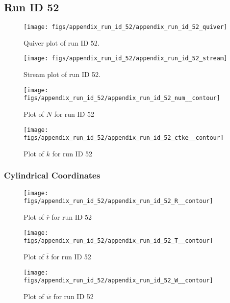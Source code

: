 \subsection{Run ID 52}
\begin{figure}[H]
\centering
\texttt{[image: figs/appendix\_run\_id\_52/appendix\_run\_id\_52\_quiver]}
\caption{Quiver plot of run ID 52.}
\label{fig:appendix_run_id_52_quiver}
\end{figure}


\begin{figure}[H]
\centering
\texttt{[image: figs/appendix\_run\_id\_52/appendix\_run\_id\_52\_stream]}
\caption{Stream plot of run ID 52.}
\label{fig:appendix_run_id_52_stream}
\end{figure}


\begin{figure}[H]
\centering
\texttt{[image: figs/appendix\_run\_id\_52/appendix\_run\_id\_52\_num\_\_contour]}
\caption{Plot of $N$ for run ID 52}
\label{fig:appendix_run_id_52_num__contour}
\end{figure}


\begin{figure}[H]
\centering
\texttt{[image: figs/appendix\_run\_id\_52/appendix\_run\_id\_52\_ctke\_\_contour]}
\caption{Plot of $k$ for run ID 52}
\label{fig:appendix_run_id_52_ctke__contour}
\end{figure}


\subsubsection{Cylindrical Coordinates}
\begin{figure}[H]
\centering
\texttt{[image: figs/appendix\_run\_id\_52/appendix\_run\_id\_52\_R\_\_contour]}
\caption{Plot of $\overline{r}$ for run ID 52}
\label{fig:appendix_run_id_52_R__contour}
\end{figure}


\begin{figure}[H]
\centering
\texttt{[image: figs/appendix\_run\_id\_52/appendix\_run\_id\_52\_T\_\_contour]}
\caption{Plot of $\overline{t}$ for run ID 52}
\label{fig:appendix_run_id_52_T__contour}
\end{figure}


\begin{figure}[H]
\centering
\texttt{[image: figs/appendix\_run\_id\_52/appendix\_run\_id\_52\_W\_\_contour]}
\caption{Plot of $\overline{w}$ for run ID 52}
\label{fig:appendix_run_id_52_W__contour}
\end{figure}


